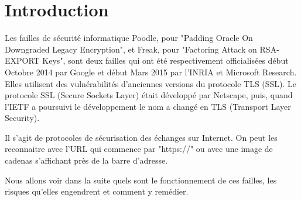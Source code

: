 \section*{Introduction}

Les failles de sécurité informatique Poodle, pour "Padding Oracle On Downgraded Legacy Encryption", et Freak, pour "Factoring Attack on RSA-EXPORT Keys", sont deux failles qui ont été respectivement officialisées début Octobre 2014 par Google et début Mars 2015 par l'INRIA et Microsoft Research. Elles utilisent des vulnérabilités d'anciennes versions du protocole TLS (SSL). Le protocole SSL (Secure Sockets Layer) était développé par Netscape, puis, quand l'IETF a poursuivi le développement le nom a changé en TLS (Transport Layer Security). 

 
Il s'agit de protocoles de sécurisation des échanges sur Internet. On peut les reconnaitre avec l'URL qui commence par "https://" ou avec une image de cadenas s'affichant près de la barre d'adresse.

 
Nous allons voir dans la suite quels sont le fonctionnement de ces failles, les risques qu'elles engendrent et comment y remédier. 
